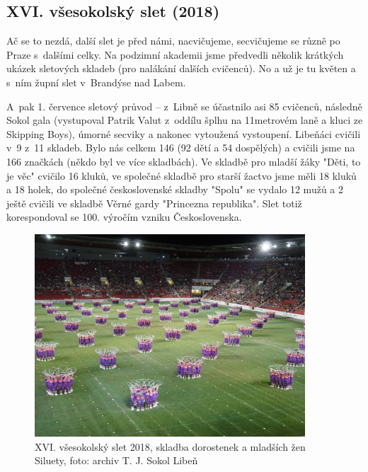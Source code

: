 \documentclass[a5paper, 11pt, twoside]{article}
\begin{document}
\subsection{XVI. všesokolský slet (2018)}

Ač se to nezdá, další slet je před námi, nacvičujeme, secvičujeme se
různě po Praze s~dalšími celky. Na podzimní akademii jsme předvedli
několik krátkých ukázek sletových skladeb (pro nalákání dalších
cvičenců). No a už je tu květen a s~ním župní slet v~Brandýse nad Labem.

A~pak 1. července sletový průvod -- z~Libně se účastnilo asi 85
cvičenců, následně Sokol gala (vystupoval Patrik Valut z~oddílu šplhu na
11metrovém laně a kluci ze Skipping Boys), úmorné secviky a nakonec
vytoužená vystoupení. Libeňáci cvičili v~9 z~11 skladeb. Bylo nás celkem
146 (92 dětí a 54 dospělých) a cvičili jsme na 166 značkách (někdo byl
ve více skladbách). Ve skladbě pro mladší žáky "Děti, to je věc"
cvičilo 16 kluků, ve společné skladbě pro starší žactvo jsme měli 18
kluků a 18 holek, do společné československé skladby "Spolu" se vydalo
12 mužů a 2 ještě cvičili ve skladbě Věrné gardy "Princezna
republika". Slet totiž korespondoval se 100. výročím vzniku
Československa.

\begin{figure}[hp]
  \centering 
  \includegraphics[width=0.9\textwidth]{img/64_siluety.JPG}
  \caption*{XVI. všesokolský slet 2018, skladba dorostenek a mladších žen
  Siluety, foto: archiv T. J. Sokol Libeň}
\end{figure}
\end{document}
